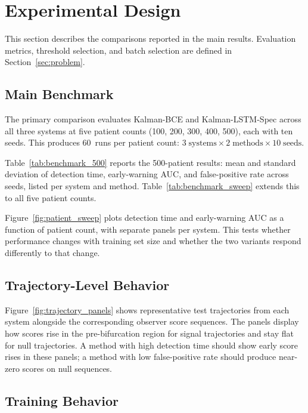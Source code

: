 \section{Experimental Design}
\label{sec:design}

This section describes the comparisons reported in the main results. Evaluation
metrics, threshold selection, and batch selection are defined in
Section~\ref{sec:problem}.

\subsection{Main Benchmark}
\label{sec:design:main}

The primary comparison evaluates Kalman-BCE and Kalman-LSTM-Spec across all
three systems at five patient counts (100, 200, 300, 400, 500), each with ten
seeds. This produces 60~runs per patient count:
\(3\;\text{systems} \times 2\;\text{methods} \times 10\;\text{seeds}\).

Table~\ref{tab:benchmark_500} reports the 500-patient results: mean and
standard deviation of detection time, early-warning AUC, and false-positive rate
across seeds, listed per system and method. Table~\ref{tab:benchmark_sweep}
extends this to all five patient counts.

Figure~\ref{fig:patient_sweep} plots detection time and early-warning AUC as a
function of patient count, with separate panels per system. This tests whether
performance changes with training set size and whether the two variants respond
differently to that change.

\subsection{Trajectory-Level Behavior}
\label{sec:design:trajectory}

Figure~\ref{fig:trajectory_panels} shows representative test trajectories from
each system alongside the corresponding observer score sequences. The panels
display how scores rise in the pre-bifurcation region for signal trajectories
and stay flat for null trajectories. A method with high detection time should
show early score rises in these panels; a method with low false-positive rate
should produce near-zero scores on null sequences.

\subsection{Training Behavior}
\label{sec:design:training}

